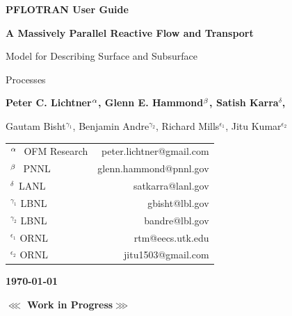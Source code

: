 \begin{center}

\dblline

\vspace{0.5 cm}

{\bf\huge PFLOTRAN User Guide}

\vspace{0.5cm}

{\bf\LARGE A Massively Parallel Reactive Flow and Transport 

Model for Describing Surface and Subsurface 

Processes}

\vspace{0.5cm}

{\bf\large Peter C. Lichtner${^{\alpha}}$, Glenn E. Hammond${^{\beta}}$, Satish Karra${^\delta}$, 

Gautam Bisht$^{\gamma_1}$, Benjamin Andre$^{\gamma_2}$, Richard Mills$^{\epsilon_1}$, Jitu Kumar$^{\epsilon_2}$}

\vspace{0.5cm}

\begin{tabular}{lr}
$^{{\alpha}_{~}}$ OFM Research & peter.lichtner@gmail.com\\
$^{{\beta}_{~}}$ PNNL & glenn.hammond@pnnl.gov\\
$^{\delta_{~}}$ LANL & satkarra@lanl.gov\\
$^{\gamma_1^{}}$ LBNL & gbisht@lbl.gov\\
$^{\gamma_2^{}}$ LBNL & bandre@lbl.gov\\
$^{\epsilon_1^{}}$ ORNL & rtm@eecs.utk.edu \\
$^{\epsilon_2^{}}$ ORNL & jitu1503@gmail.com
\end{tabular}

\vspace{0.5cm}

{\bf\large\today}


\vspace{1cm}

{\bf\LARGE $\lll$ Work in Progress$\ggg$}

\vspace{1cm}

\end{center}

